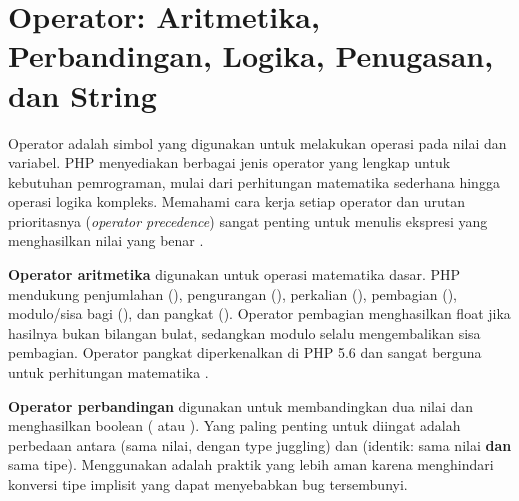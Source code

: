 ﻿\section{Operator: Aritmetika, Perbandingan, Logika, Penugasan, dan String}

Operator adalah simbol yang digunakan untuk melakukan operasi pada nilai dan variabel. PHP menyediakan berbagai jenis operator yang lengkap untuk kebutuhan pemrograman, mulai dari perhitungan matematika sederhana hingga operasi logika kompleks. Memahami cara kerja setiap operator dan urutan prioritasnya (\textit{operator precedence}) sangat penting untuk menulis ekspresi yang menghasilkan nilai yang benar \cite{phpManual}.

\textbf{Operator aritmetika} digunakan untuk operasi matematika dasar. PHP mendukung penjumlahan (\code{+}), pengurangan (\code{-}), perkalian (\code{*}), pembagian (\code{/}), modulo/sisa bagi (\code{\%}), dan pangkat (\code{**}). Operator pembagian \code{/} menghasilkan float jika hasilnya bukan bilangan bulat, sedangkan modulo selalu mengembalikan sisa pembagian. Operator pangkat \code{**} diperkenalkan di PHP 5.6 dan sangat berguna untuk perhitungan matematika \cite{w3schoolsPhp}.

\textbf{Operator perbandingan} digunakan untuk membandingkan dua nilai dan menghasilkan boolean ( atau ). Yang paling penting untuk diingat adalah perbedaan antara \code{==} (sama nilai, dengan type juggling) dan \code{===} (identik: sama nilai \textbf{dan} sama tipe). Menggunakan \code{===} adalah praktik yang lebih aman karena menghindari konversi tipe implisit yang dapat menyebabkan bug tersembunyi.


